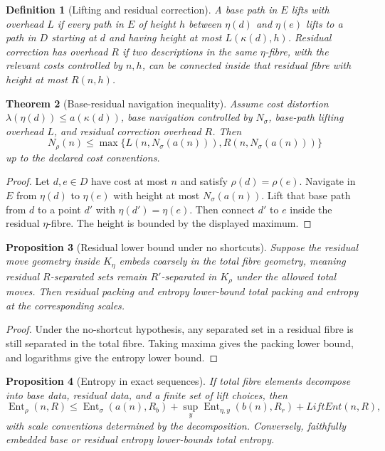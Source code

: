 \documentclass[11pt]{article}
\newtheorem{theorem}{Theorem}[section]
\newtheorem{proposition}[theorem]{Proposition}
\newtheorem{definition}[theorem]{Definition}
\DeclareMathOperator{\Ent}{Ent}
\begin{document}
\begin{definition}[Lifting and residual correction]
A base path in \(E\) lifts with overhead \(L\) if every path in \(E\) of height \(h\) between \(\eta(d)\) and \(\eta(e)\) lifts to a path in \(D\) starting at \(d\) and having height at most \(L(\kappa(d),h)\).  Residual correction has overhead \(R\) if two descriptions in the same \(\eta\)-fibre, with the relevant costs controlled by \(n,h\), can be connected inside that residual fibre with height at most \(R(n,h)\).
\end{definition}

\begin{theorem}[Base-residual navigation inequality]
Assume cost distortion \(\lambda(\eta(d))\le a(\kappa(d))\), base navigation controlled by \(N_\sigma\), base-path lifting overhead \(L\), and residual correction overhead \(R\).  Then
\[
N_\rho(n)\le
\max\{L(n,N_\sigma(a(n))),R(n,N_\sigma(a(n)))\}
\]
up to the declared cost conventions.
\end{theorem}

\begin{proof}
Let \(d,e\in D\) have cost at most \(n\) and satisfy \(\rho(d)=\rho(e)\).  Navigate in \(E\) from \(\eta(d)\) to \(\eta(e)\) with height at most \(N_\sigma(a(n))\).  Lift that base path from \(d\) to a point \(d'\) with \(\eta(d')=\eta(e)\).  Then connect \(d'\) to \(e\) inside the residual \(\eta\)-fibre.  The height is bounded by the displayed maximum.
\end{proof}

\begin{proposition}[Residual lower bound under no shortcuts]
Suppose the residual move geometry inside \(K_\eta\) embeds coarsely in the total fibre geometry, meaning residual \(R\)-separated sets remain \(R'\)-separated in \(K_\rho\) under the allowed total moves.  Then residual packing and entropy lower-bound total packing and entropy at the corresponding scales.
\end{proposition}

\begin{proof}
Under the no-shortcut hypothesis, any separated set in a residual fibre is still separated in the total fibre.  Taking maxima gives the packing lower bound, and logarithms give the entropy lower bound.
\end{proof}

\begin{proposition}[Entropy in exact sequences]
If total fibre elements decompose into base data, residual data, and a finite set of lift choices, then
\[
\Ent_\rho(n,R)\le
\Ent_\sigma(a(n),R_b)+
\sup_y\Ent_{\eta,y}(b(n),R_r)+
LiftEnt(n,R),
\]
with scale conventions determined by the decomposition.  Conversely, faithfully embedded base or residual entropy lower-bounds total entropy.
\end{proposition}
\end{document}

